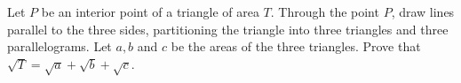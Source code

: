 Let $P$ be an interior point of a triangle of area $T$. Through the point $P$,
draw lines parallel to the three sides, partitioning the triangle into three
triangles and three parallelograms. Let $a, b$ and $c$ be the areas of the
three triangles. Prove that $\sqrt{T} = \sqrt{a} + \sqrt{b} + \sqrt{c}$.

